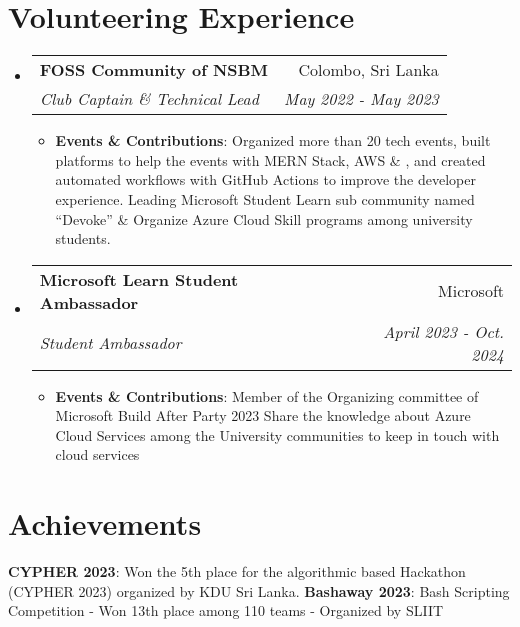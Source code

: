 \documentclass[letterpaper,11pt]{article}
\makeatletter
\newcommand{\resumeItem}[2]{
  \item\small{
    \textbf{#1}{: #2 \vspace{-2pt}}
  }
}
\newcommand{\resumeSubheading}[4]{
  \vspace{-1pt}\item
    \begin{tabular*}{0.97\textwidth}{l@{\extracolsep{\fill}}r}
      \textbf{#1} & #2 \\
      \textit{\small#3} & \textit{\small #4} \\
    \end{tabular*}\vspace{-5pt}
}
\newcommand{\resumeSubHeadingListStart}{\begin{itemize}[leftmargin=*]}
\newcommand{\resumeSubHeadingListEnd}{\end{itemize}}
\newcommand{\resumeItemListStart}{\begin{itemize}}
\newcommand{\resumeItemListEnd}{\end{itemize}\vspace{-5pt}}
\makeatother
\begin{document}
\section{Volunteering Experience}
  \resumeSubHeadingListStart
  \resumeSubheading
      {FOSS Community of NSBM}{Colombo, Sri Lanka}
      {Club Captain \& Technical Lead}{May 2022 - May 2023}
      \resumeItemListStart
        \resumeItem{Events \& Contributions}
          {Organized more than 20 tech events, built platforms to help the events with MERN Stack, AWS \& , and created automated workflows with GitHub Actions to improve the developer experience. Leading Microsoft Student Learn sub community named “Devoke” \& Organize Azure Cloud Skill programs among university students. }
      \resumeItemListEnd

        \resumeSubheading
      {Microsoft Learn Student Ambassador}{Microsoft}
      {Student Ambassador}{April 2023 - Oct. 2024}
      \resumeItemListStart
        \resumeItem{Events \& Contributions}
          {Member of the Organizing committee of Microsoft Build After Party 2023 Share the knowledge about Azure Cloud Services among the University communities to keep in touch with cloud services }
      \resumeItemListEnd
  \resumeSubHeadingListEnd


\section{Achievements}
   \resumeSubHeadingListStart
   
     \textbf{CYPHER 2023}{: Won the 5th place for the algorithmic based Hackathon (CYPHER 2023) organized by KDU Sri Lanka. }
     \newline
     \textbf{Bashaway 2023}{: Bash Scripting Competition - Won 13th place among 110 teams - Organized by SLIIT  }

 \resumeSubHeadingListEnd

\end{document}
